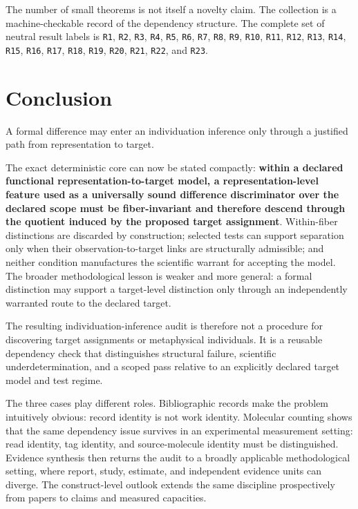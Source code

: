 \documentclass[12pt]{article}
\begin{document}
The number of small theorems is not itself a novelty claim. The collection is a machine-checkable record of the dependency structure. The complete set of neutral result labels is \texttt{R1}, \texttt{R2}, \texttt{R3}, \texttt{R4}, \texttt{R5}, \texttt{R6}, \texttt{R7}, \texttt{R8}, \texttt{R9}, \texttt{R10}, \texttt{R11}, \texttt{R12}, \texttt{R13}, \texttt{R14}, \texttt{R15}, \texttt{R16}, \texttt{R17}, \texttt{R18}, \texttt{R19}, \texttt{R20}, \texttt{R21}, \texttt{R22}, and \texttt{R23}.

\section{Conclusion}

A formal difference may enter an individuation inference only through a justified path from representation to target.

The exact deterministic core can now be stated compactly: \textbf{within a declared functional representation-to-target model, a representation-level feature used as a universally sound difference discriminator over the declared scope must be fiber-invariant and therefore descend through the quotient induced by the proposed target assignment}. Within-fiber distinctions are discarded by construction; selected tests can support separation only when their observation-to-target links are structurally admissible; and neither condition manufactures the scientific warrant for accepting the model. The broader methodological lesson is weaker and more general: a formal distinction may support a target-level distinction only through an independently warranted route to the declared target.

The resulting individuation-inference audit is therefore not a procedure for discovering target assignments or metaphysical individuals. It is a reusable dependency check that distinguishes structural failure, scientific underdetermination, and a scoped pass relative to an explicitly declared target model and test regime.

The three cases play different roles. Bibliographic records make the problem intuitively obvious: record identity is not work identity. Molecular counting shows that the same dependency issue survives in an experimental measurement setting: read identity, tag identity, and source-molecule identity must be distinguished. Evidence synthesis then returns the audit to a broadly applicable methodological setting, where report, study, estimate, and independent evidence units can diverge. The construct-level outlook extends the same discipline prospectively from papers to claims and measured capacities.
\end{document}
